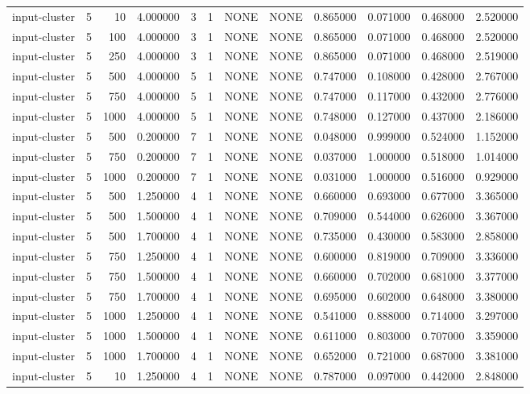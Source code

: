 \begin{tabular}{lrrrllllrrrr}
input-cluster & 5 & 10 & 4.000000 & 3 & 1 & NONE & NONE & 0.865000 & 0.071000 & 0.468000 & 2.520000 \\
input-cluster & 5 & 100 & 4.000000 & 3 & 1 & NONE & NONE & 0.865000 & 0.071000 & 0.468000 & 2.520000 \\
input-cluster & 5 & 250 & 4.000000 & 3 & 1 & NONE & NONE & 0.865000 & 0.071000 & 0.468000 & 2.519000 \\
input-cluster & 5 & 500 & 4.000000 & 5 & 1 & NONE & NONE & 0.747000 & 0.108000 & 0.428000 & 2.767000 \\
input-cluster & 5 & 750 & 4.000000 & 5 & 1 & NONE & NONE & 0.747000 & 0.117000 & 0.432000 & 2.776000 \\
input-cluster & 5 & 1000 & 4.000000 & 5 & 1 & NONE & NONE & 0.748000 & 0.127000 & 0.437000 & 2.186000 \\
input-cluster & 5 & 500 & 0.200000 & 7 & 1 & NONE & NONE & 0.048000 & 0.999000 & 0.524000 & 1.152000 \\
input-cluster & 5 & 750 & 0.200000 & 7 & 1 & NONE & NONE & 0.037000 & 1.000000 & 0.518000 & 1.014000 \\
input-cluster & 5 & 1000 & 0.200000 & 7 & 1 & NONE & NONE & 0.031000 & 1.000000 & 0.516000 & 0.929000 \\
input-cluster & 5 & 500 & 1.250000 & 4 & 1 & NONE & NONE & 0.660000 & 0.693000 & 0.677000 & 3.365000 \\
input-cluster & 5 & 500 & 1.500000 & 4 & 1 & NONE & NONE & 0.709000 & 0.544000 & 0.626000 & 3.367000 \\
input-cluster & 5 & 500 & 1.700000 & 4 & 1 & NONE & NONE & 0.735000 & 0.430000 & 0.583000 & 2.858000 \\
input-cluster & 5 & 750 & 1.250000 & 4 & 1 & NONE & NONE & 0.600000 & 0.819000 & 0.709000 & 3.336000 \\
input-cluster & 5 & 750 & 1.500000 & 4 & 1 & NONE & NONE & 0.660000 & 0.702000 & 0.681000 & 3.377000 \\
input-cluster & 5 & 750 & 1.700000 & 4 & 1 & NONE & NONE & 0.695000 & 0.602000 & 0.648000 & 3.380000 \\
input-cluster & 5 & 1000 & 1.250000 & 4 & 1 & NONE & NONE & 0.541000 & 0.888000 & 0.714000 & 3.297000 \\
input-cluster & 5 & 1000 & 1.500000 & 4 & 1 & NONE & NONE & 0.611000 & 0.803000 & 0.707000 & 3.359000 \\
input-cluster & 5 & 1000 & 1.700000 & 4 & 1 & NONE & NONE & 0.652000 & 0.721000 & 0.687000 & 3.381000 \\
input-cluster & 5 & 10 & 1.250000 & 4 & 1 & NONE & NONE & 0.787000 & 0.097000 & 0.442000 & 2.848000 \\

\end{tabular}
